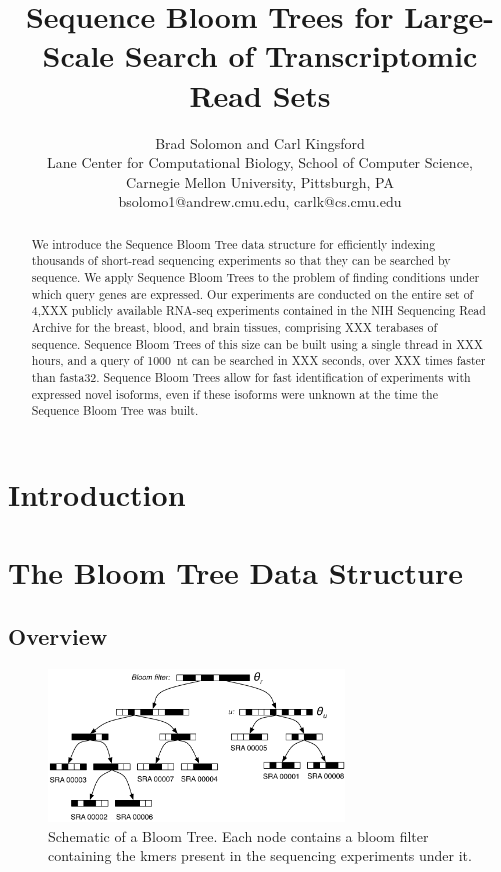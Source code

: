 \documentclass[11pt]{article}
\title{Sequence Bloom Trees for Large-Scale Search of Transcriptomic Read Sets}
\author{Brad Solomon and Carl Kingsford\\
Lane Center for Computational Biology, School of Computer Science,\\
Carnegie Mellon University, Pittsburgh, PA\\
bsolomo1@andrew.cmu.edu, carlk@cs.cmu.edu}
\date{}
\begin{document}
\maketitle
\begin{abstract}
We introduce the Sequence Bloom Tree data structure for efficiently indexing thousands of short-read sequencing experiments so that they can be searched by sequence. We apply Sequence Bloom Trees to the problem of finding conditions under which query genes are expressed. Our experiments are conducted on the entire set of 4,XXX publicly available RNA-seq experiments contained in the NIH Sequencing Read Archive for the breast, blood, and brain tissues, comprising XXX terabases of sequence. Sequence Bloom Trees of this size can be built using a single thread in XXX hours, and a query of 1000~nt can be searched in XXX seconds, over XXX times faster than fasta32.  Sequence Bloom Trees allow for fast identification of experiments with expressed novel isoforms, even if these isoforms were unknown at the time the Sequence Bloom Tree was built. 
\end{abstract}

\section{Introduction}






\section{The Bloom Tree Data Structure}

\subsection{Overview}
\begin{figure}
\centering
\includegraphics[width=0.7\textwidth]{BloomTreeSchematic}
\caption{Schematic of a Bloom Tree. Each node contains a bloom filter containing the kmers present in the sequencing experiments under it.}
\end{figure}
\end{document}
